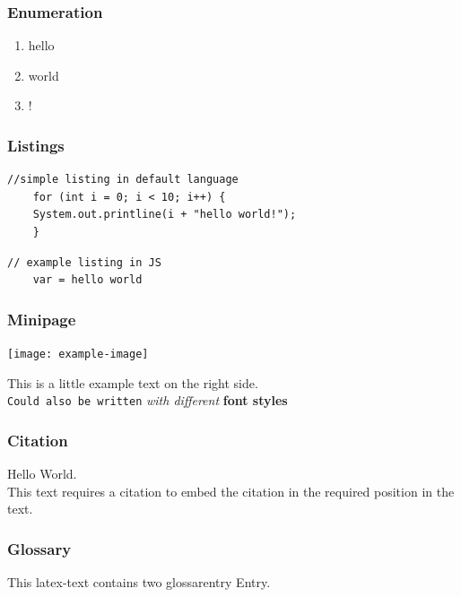 \subsubsection{Enumeration}
\begin{enumerate}
    \item hello
    \item world
    \item !
\end{enumerate}

\subsubsection{Listings}
\begin{lstlisting}[caption=example listing,label={lst:lstlisting}]
//simple listing in default language
    for (int i = 0; i < 10; i++) {
    System.out.printline(i + "hello world!");
    }
\end{lstlisting}

\begin{lstlisting}[firstnumber=17, caption=example listing, style=JavaScript, label={lst:lstlisting2}]
// example listing in JS
    var = hello world
\end{lstlisting}


\subsubsection{Minipage}
\begin{minipage}{0.5\linewidth}
    \begin{center}
        \texttt{[image: example-image]}
        \vspace{-8pt}
    \end{center}
\end{minipage}
\begin{minipage}{0.45\linewidth}
    This is a little example text on the right side.\\
    \texttt{Could also be written} \textit{with different} \textbf{font styles}
\end{minipage}

\newpage

\subsubsection{Citation}
Hello World\cite{DummyEntry}. \\

This text requires a citation \cite{einstein} to embed the citation in the required position in the text.

\subsubsection{Glossary}
This \gls{latex}-text contains two \gls{glossarentry} Entry.